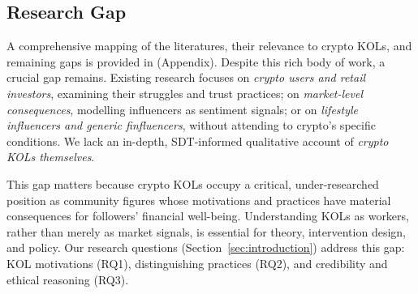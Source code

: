 \subsection{Research Gap}

A comprehensive mapping of the literatures, their relevance to crypto KOLs, and remaining gaps is provided in  (Appendix). Despite this rich body of work, a crucial gap remains. Existing research focuses on \emph{crypto users and retail investors}, examining their struggles and trust practices; on \emph{market-level consequences}, modelling influencers as sentiment signals; or on \emph{lifestyle influencers and generic finfluencers}, without attending to crypto's specific conditions. We lack an in-depth, SDT-informed qualitative account of \emph{crypto KOLs themselves}.

This gap matters because crypto KOLs occupy a critical, under-researched position as community figures whose motivations and practices have material consequences for followers' financial well-being. Understanding KOLs as workers, rather than merely as market signals, is essential for theory, intervention design, and policy. Our research questions (Section~\ref{sec:introduction}) address this gap: KOL motivations (RQ1), distinguishing practices (RQ2), and credibility and ethical reasoning (RQ3).

